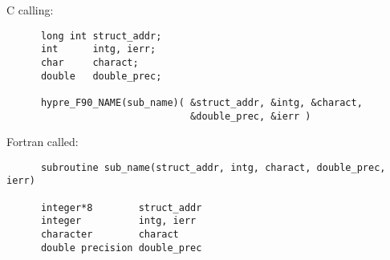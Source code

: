   C calling:
\begin{verbatim}
      long int struct_addr;
      int      intg, ierr;
      char     charact;
      double   double_prec;

      hypre_F90_NAME(sub_name)( &struct_addr, &intg, &charact,
                                &double_prec, &ierr )
\end{verbatim}

  Fortran called:
\begin{verbatim}
      subroutine sub_name(struct_addr, intg, charact, double_prec, ierr)

      integer*8        struct_addr
      integer          intg, ierr
      character        charact
      double precision double_prec
\end{verbatim}

